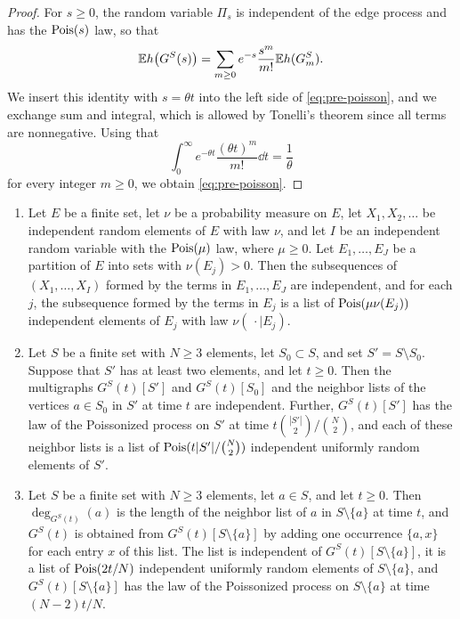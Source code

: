 \begin{proof}
For $s \ge 0$, the random variable $\Pi_s$ is independent of the edge process and has the $\operatorname{Pois}(s)$ law, so that
\[
\mathbb E h\big(G^S(s)\big) = \sum_{m \ge 0} e^{-s} \frac{s^m}{m!} \mathbb E h(G^S_m).
\]
We insert this identity with $s = \theta t$ into the left side of \eqref{eq:pre-poisson}, and we exchange sum and integral, which is allowed by Tonelli's theorem since all terms are nonnegative. Using that
\[
\int_0^\infty e^{-\theta t} \frac{(\theta t)^m}{m!} \dd t = \frac{1}{\theta}
\]
for every integer $m \ge 0$, we obtain \eqref{eq:pre-poisson}.
\end{proof}

\begin{lemma}\label{lem:pre-split}
\begin{enumerate}[label=(\alph*)]
\item Let $E$ be a finite set, let $\nu$ be a probability measure on $E$, let $X_1, X_2, \dots$ be independent random elements of $E$ with law $\nu$, and let $I$ be an independent random variable with the $\operatorname{Pois}(\mu)$ law, where $\mu \ge 0$. Let $E_1, \dots, E_{J}$ be a partition of $E$ into sets with $\nu(E_j) > 0$. Then the subsequences of $(X_1, \dots, X_I)$ formed by the terms in $E_1, \dots, E_{J}$ are independent, and for each $j$, the subsequence formed by the terms in $E_j$ is a list of $\operatorname{Pois}(\mu \nu(E_j))$ independent elements of $E_j$ with law $\nu(\, \cdot \mid E_j)$.
\item Let $S$ be a finite set with $N \ge 3$ elements, let $S_0 \subset S$, and set $S' = S \setminus S_0$. Suppose that $S'$ has at least two elements, and let $t \ge 0$. Then the multigraphs $G^S(t)[S']$ and $G^S(t)[S_0]$ and the neighbor lists of the vertices $a \in S_0$ in $S'$ at time $t$ are independent. Further, $G^S(t)[S']$ has the law of the Poissonized process on $S'$ at time $t \binom{|S'|}{2}/\binom{N}{2}$, and each of these neighbor lists is a list of $\operatorname{Pois}(t |S'|/\binom{N}{2})$ independent uniformly random elements of $S'$.
\item Let $S$ be a finite set with $N \ge 3$ elements, let $a \in S$, and let $t \ge 0$. Then $\deg_{G^S(t)}(a)$ is the length of the neighbor list of $a$ in $S \setminus \{a\}$ at time $t$, and $G^S(t)$ is obtained from $G^S(t)[S \setminus \{a\}]$ by adding one occurrence $\{a, x\}$ for each entry $x$ of this list. The list is independent of $G^S(t)[S \setminus \{a\}]$, it is a list of $\operatorname{Pois}(2t/N)$ independent uniformly random elements of $S \setminus \{a\}$, and $G^S(t)[S \setminus \{a\}]$ has the law of the Poissonized process on $S \setminus \{a\}$ at time $(N - 2) t/N$.
\end{enumerate}
\end{lemma}

